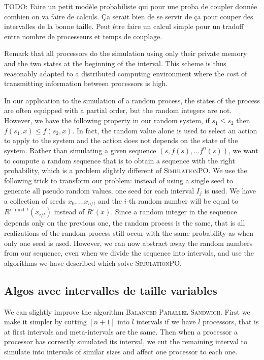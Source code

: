 \documentclass[a4paper,10pt]{article}
\newcommand{\todo}[1]{{\color{red} TODO: {#1}}}
\begin{document}
 \todo{Faire un petit modèle probabiliste qui pour une proba de coupler donnée combien on va faire de calculs.
 Ça serait bien de se servir de ça pour couper des intervalles de la bonne taille. 
 Peut être faire un calcul simple pour un tradoff entre nombre de processeurs et temps de couplage.}
 
Remark that all processors do the simulation using only their private memory and the two states at the beginning of the interval. This scheme is thus reasonably adapted to a distributed computing environment where the cost of transmitting information between processors is high. 

In our application to the simulation of a random process, the states of the process 
are often equipped with a partial order, but the random integers are not. 
However, we have the following property in our random system, if $s_1 \leq s_2$ then $f(s_1,x) \leq f(s_2,x)$. 
In fact, the random value alone is used to select an action to apply to the system and the action does not depends on the state of the system. Rather than simulating a given sequence $(s,f(s),\dots f^n(s))$, we want to compute a random sequence
that is to obtain a sequence with the right probability, which is a problem slightly different of \textsc{SimulationPO}.
We use the following trick to transform our problem: instead of using a single seed to generate all pseudo random values, one seed for each interval $I_j$ is used. We have a collection of seeds $x_0, \dots x_{n/t}$ and the $i$-th random number will be equal to $R^{i \mod t}(x_{i/t})$ instead of $R^i(x)$.
Since a random integer in the sequence depends only on the previous one, the random process is the same, that is  all realizations of the random process still occur with the same probability as when only one seed is used.
However, we can now abstract away the random numbers from our sequence, even when we divide the sequence into intervals, 
and use the algorithms we have described which solve \textsc{SimulationPO}.

\subsection{Algos avec intervalles de taille variables}


We can slightly improve the algorithm \textsc{Balanced Parallel Sandwich}.
First we make it simpler by cutting $[n+1]$ into $l$ intervals if we have $l$
processors, that is at first intervals and meta-intervals are the same. Then when a processor
a processor has correctly simulated its interval, we cut the remaining interval to simulate into 
intervals of similar sizes and affect one processor to each one.
\end{document}
